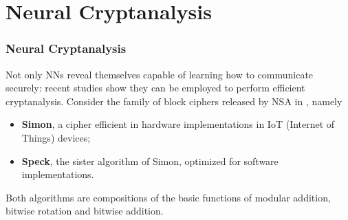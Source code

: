 \documentclass{beamer}
\begin{document}





\section{Neural Cryptanalysis}
\begin{frame}
\frametitle{Neural Cryptanalysis}
Not only NNs reveal themselves capable of learning how to communicate securely: recent studies show they can be employed
to perform efficient cryptanalysis. Consider the family of block ciphers released by NSA in \cite{nsa}, namely
\begin{itemize}
\item \textbf{Simon}, a cipher efficient in hardware implementations in IoT (Internet of Things) devices;
\item \textbf{Speck}, the sister algorithm of Simon, optimized for software implementations.
\end{itemize}
Both algorithms are compositions of the basic functions of modular addition, bitwise rotation and bitwise addition.
\end{frame}
\end{document}
